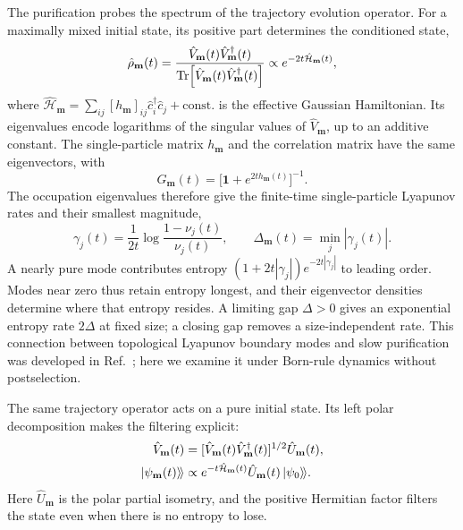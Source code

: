 \documentclass[aps,prb,10pt,twocolumn,superscriptaddress,longbibliography,floatfix]{revtex4-2}
\newcommand{\kett}[1]{\ket{#1}\!\rangle}
\newcommand{\rec}{\mathbf m}   %
\begin{document}
{The purification probes the spectrum of the trajectory evolution operator. For a maximally mixed initial state, its positive part determines the conditioned state,
\begin{equation}
 \hat\rho_{\rec}(t)=\frac{\hat V_{\rec}(t)\hat V_{\rec}^\dagger(t)}
 {\Tr[\hat V_{\rec}(t)\hat V_{\rec}^\dagger(t)]}
 \propto e^{-2t\hat{\mathcal H}_{\rec}(t)},
 \label{eq:PurificationKrausProduct}
\end{equation}
where $\hat{\mathcal H}_{\rec}=\sum_{ij}[h_{\rec}]_{ij}\hat c_i^\dagger\hat c_j+\mathrm{const.}$ is the effective Gaussian Hamiltonian. Its eigenvalues encode logarithms of the singular values of $\hat V_{\rec}$, up to an additive constant. The single-particle matrix $h_{\rec}$ and the correlation matrix have the same eigenvectors, with
\begin{equation}
 G_{\rec}(t)=\big[\mathbf{1}+e^{2t h_{\rec}(t)}\big]^{-1}.
 \label{eq:PurificationFermiFunction}
\end{equation}
The occupation eigenvalues therefore give the finite-time single-particle Lyapunov rates and their smallest magnitude,
\begin{equation}
 \gamma_j(t)=\frac{1}{2t}\log\frac{1-\nu_j(t)}{\nu_j(t)},\qquad
 \Delta_{\rec}(t)=\min_j|\gamma_j(t)|.
 \label{eq:LyapunovFromOccupations}
\end{equation}
A nearly pure mode contributes entropy $(1+2t|\gamma_j|)e^{-2t|\gamma_j|}$ to leading order. Modes near zero thus retain entropy longest, and their eigenvector densities determine where that entropy resides. A limiting gap $\Delta>0$ gives an exponential entropy rate $2\Delta$ at fixed size; a closing gap removes a size-independent rate. This connection between topological Lyapunov boundary modes and slow purification was developed in Ref.~\cite{XiaoKawabata2026}; here we examine it under Born-rule dynamics without postselection.

{\color{blue}
The same trajectory operator acts on a pure initial state. Its left polar decomposition makes the filtering explicit:
\begin{equation}
 \begin{aligned}
 \hat V_{\rec}(t)&=[\hat V_{\rec}(t)\hat V_{\rec}^\dagger(t)]^{1/2}
                   \hat U_{\rec}(t),\\
 \kett{\psi_{\rec}(t)}&\propto e^{-t\hat{\mathcal H}_{\rec}(t)}
                       \hat U_{\rec}(t)\kett{\psi_0}.
 \end{aligned}
 \label{eq:PureTrajectoryFiltering}
\end{equation}
Here $\hat U_{\rec}$ is the polar partial isometry, and the positive Hermitian factor filters the state even when there is no entropy to lose.
}

}
\end{document}

